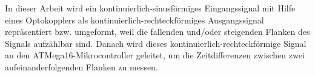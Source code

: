 







In dieser Arbeit wird ein kontinuierlich-sinusförmiges Eingangssignal mit Hilfe eines Optokopplers als kontinuierlich-rechteckförmiges Ausgangssignal repräsentiert bzw. umgeformt, weil die fallenden und/oder steigenden Flanken des Signals aufzählbar sind. Danach wird dieses kontinuierlich-rechteckförmige Signal an den ATMega16-Mikrocontroller geleitet, um die Zeitdifferenzen zwischen zwei aufeinanderfolgenden Flanken zu messen.

